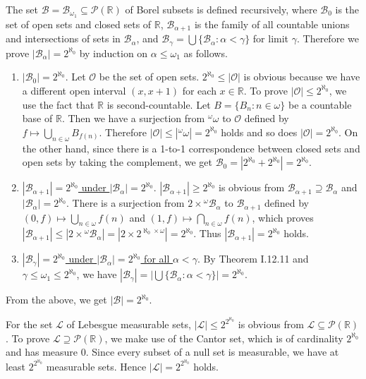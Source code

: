 \documentclass[12pt]{article}
\theoremstyle{definition}
\newenvironment{customthm}[1]
  {\renewcommand\theinnercustomthm{#1}\innercustomthm}
  {\endinnercustomthm}
\begin{document}
\begin{customthm}{I.15.9} The set $\mathcal{B}=\mathcal{B}_{\omega_1}\subseteq\mathcal{P}(\mathbb{R})$ of Borel subsets is defined recursively, where $\mathcal{B}_0$ is the set of open sets and closed sets of $\mathbb{R}$, $\mathcal{B}_{\alpha+1}$ is the family of all countable unions and intersections of sets in $\mathcal{B}_\alpha$, and $\mathcal{B}_\gamma=\bigcup\{\mathcal{B}_\alpha:\alpha<\gamma\}$ for limit $\gamma$. Therefore we prove $|\mathcal{B_\alpha}|=2^{\aleph_0}$ by induction on $\alpha\leq\omega_1$ as follows.
\begin{enumerate}
\item\underline{$|\mathcal{B}_0|=2^{\aleph_0}$}. Let $\mathcal{O}$ be the set of open sets. $2^{\aleph_0}\leq|\mathcal{O}|$ is obvious because we have a different open interval $(x,x+1)$ for each $x\in\mathbb{R}$. To prove $|\mathcal{O}|\leq2^{\aleph_0}$, we use the fact that $\mathbb{R}$ is second-countable. Let $B=\{B_n:n\in\omega\}$ be a countable base of $\mathbb{R}$. Then we have a surjection from ${}^\omega\omega$ to $\mathcal{O}$ defined by $f\mapsto\bigcup_{n\in\omega}B_{f(n)}$. Therefore $|\mathcal{O}|\leq|{}^\omega\omega|=2^{\aleph_0}$ holds and so does $|\mathcal{O}|=2^{\aleph_0}$. On the other hand, since there is a 1-to-1 correspondence between closed sets and open sets by taking the complement, we get $\mathcal{B}_0=|2^{\aleph_0}+2^{\aleph_0}|=2^{\aleph_0}$.
\item\underline{$|\mathcal{B}_{\alpha+1}|=2^{\aleph_0}$ under $|\mathcal{B}_\alpha|=2^{\aleph_0}$}.  $|\mathcal{B}_{\alpha+1}|\geq2^{\aleph_0}$ is obvious from $\mathcal{B}_{\alpha+1}\supseteq\mathcal{B}_\alpha$ and $|\mathcal{B}_\alpha|=2^{\aleph_0}$. There is a surjection from $2\times{}^\omega\mathcal{B}_{\alpha}$ to $\mathcal{B}_{\alpha+1}$ defined by $(0,f)\mapsto\bigcup_{n\in\omega}f(n)$ and $(1,f)\mapsto\bigcap_{n\in\omega}f(n)$, which proves $|\mathcal{B}_{\alpha+1}|\leq|2\times{}^\omega\mathcal{B}_{\alpha}|=|2\times2^{\aleph_0\times\omega}|=2^{\aleph_0}$. Thus $|\mathcal{B}_{\alpha+1}|=2^{\aleph_0}$ holds.
\item\underline{$|\mathcal{B}_\gamma|=2^{\aleph_0}$ under $|\mathcal{B}_\alpha|=2^{\aleph_0}$ for all $\alpha<\gamma$}. By Theorem I.12.11 and $\gamma\leq\omega_1\leq2^{\aleph_0}$, we have $|\mathcal{B}_\gamma|=|\bigcup\{\mathcal{B}_\alpha:\alpha<\gamma\}|=2^{\aleph_0}$.
\end{enumerate}
From the above, we get $|\mathcal{B}|=2^{\aleph_0}$.

For the set $\mathcal{L}$ of Lebesgue measurable sets, $|\mathcal{L}|\leq2^{2^{\aleph_0}}$ is obvious from $\mathcal{L}\subseteq\mathcal{P}(\mathbb{R})$. To prove $\mathcal{L}\supseteq\mathcal{P}(\mathbb{R})$, we make use of the Cantor set, which is of cardinality $2^{\aleph_0}$ and has measure $0$. Since every subset of a null set is measurable, we have at least $2^{2^{\aleph_0}}$ measurable sets. Hence $|\mathcal{L}|=2^{2^{\aleph_0}}$ holds.
\end{customthm}
\end{document}
